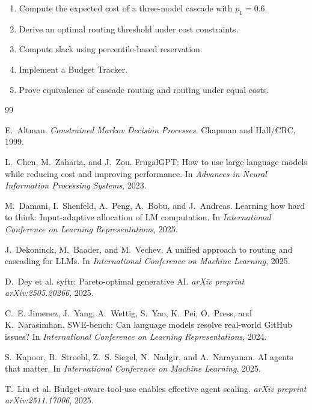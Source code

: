 \begin{enumerate}
\item Compute the expected cost of a three-model cascade with $p_1=0.6$.
\item Derive an optimal routing threshold under cost constraints.
\item Compute slack using percentile-based reservation.
\item Implement a Budget Tracker.
\item Prove equivalence of cascade routing and routing under equal costs.
\end{enumerate}
\begin{thebibliography}{99}

E.~Altman.
\newblock \emph{Constrained Markov Decision Processes}.
\newblock Chapman and Hall/CRC, 1999.

L.~Chen, M.~Zaharia, and J.~Zou.
\newblock FrugalGPT: How to use large language models while reducing cost and improving performance.
\newblock In \emph{Advances in Neural Information Processing Systems}, 2023.

M.~Damani, I.~Shenfeld, A.~Peng, A.~Bobu, and J.~Andreas.
\newblock Learning how hard to think: Input-adaptive allocation of LM computation.
\newblock In \emph{International Conference on Learning Representations}, 2025.

J.~Dekoninck, M.~Baader, and M.~Vechev.
\newblock A unified approach to routing and cascading for LLMs.
\newblock In \emph{International Conference on Machine Learning}, 2025.

D.~Dey et al.
\newblock syftr: Pareto-optimal generative AI.
\newblock \emph{arXiv preprint arXiv:2505.20266}, 2025.

C.~E. Jimenez, J.~Yang, A.~Wettig, S.~Yao, K.~Pei, O.~Press, and K.~Narasimhan.
\newblock SWE-bench: Can language models resolve real-world GitHub issues?
\newblock In \emph{International Conference on Learning Representations}, 2024.

S.~Kapoor, B.~Stroebl, Z.~S. Siegel, N.~Nadgir, and A.~Narayanan.
\newblock AI agents that matter.
\newblock In \emph{International Conference on Machine Learning}, 2025.

T.~Liu et al.
\newblock Budget-aware tool-use enables effective agent scaling.
\newblock \emph{arXiv preprint arXiv:2511.17006}, 2025.


\end{thebibliography}
